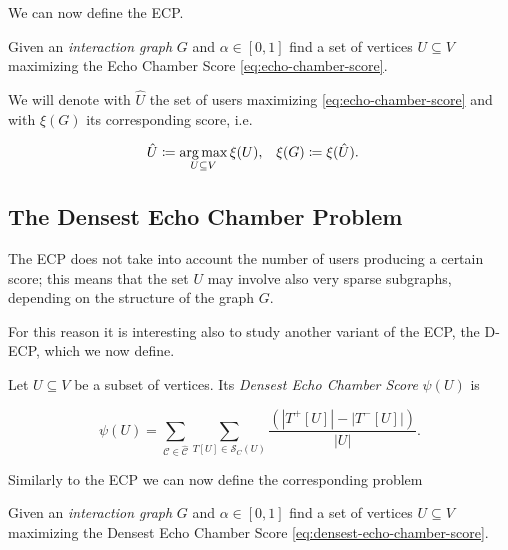 We can now define the \acrfull{ECP}.

\begin{problem}
Given an \emph{interaction graph} $G$ and $\alpha \in [0, 1]$ find a set of vertices $U \subseteq
	V$ maximizing the Echo Chamber Score \eqref{eq:echo-chamber-score}.
\end{problem}

We will denote with $\hat{U}$ the set of users maximizing
\eqref{eq:echo-chamber-score} and with $\xi(G)$ its corresponding score, i.e.

\begin{align*}
	\hat{U} & \coloneqq \operatorname*{arg\,max}_{U \subseteq V} \xi(U), & \xi(G) & \coloneqq
	\xi(\hat{U}).
\end{align*}

\subsection{The Densest Echo Chamber Problem}%
\label{sub:the_densest_echo_chamber_problem}

The \acrshort{ECP} does not take into account the number of users producing a
certain score; this means that the set $U$ may involve also very sparse
subgraphs, depending on the structure of the graph $G$.

For this reason it is interesting also to study another variant of the
\acrshort{ECP}, the \acrfull{D-ECP}, which we now define.

\begin{definition}
	Let $U \subseteq V$ be a subset of vertices. Its \emph{Densest Echo Chamber Score}
	$\psi(U)$ is

	\begin{equation}
		\label{eq:densest-echo-chamber-score}
		\psi(U) = \sum^{}_{\mathcal{C} \in \mathcal{\hat{C}}} \sum^{}_{T[U] \in
		\mathcal{S}_C (U)} \frac{(|T^{+} [U]| - |T ^{-} [U]|)}{|U|}.
	\end{equation}
\end{definition}

Similarly to the \acrshort{ECP} we can now define the corresponding problem

\begin{problem}
Given an \emph{interaction graph} $G$ and $\alpha \in [0, 1]$ find a set of vertices $U \subseteq
	V$ maximizing the Densest Echo Chamber Score \eqref{eq:densest-echo-chamber-score}.
\end{problem}

